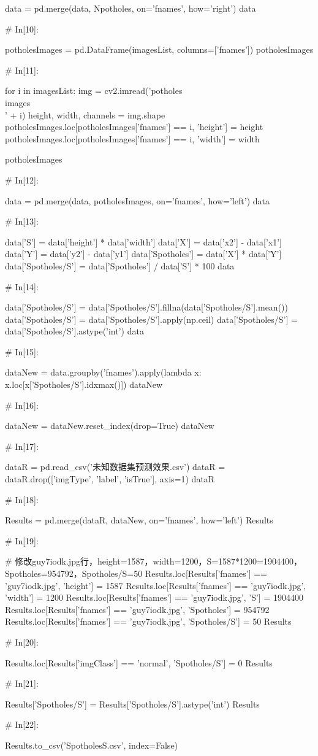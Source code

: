 \documentclass{MathorCupmodeling}
\begin{document}
\begin{python}
data = pd.merge(data, Npotholes, on='fnames', how='right')
data

# In[10]:


potholesImages = pd.DataFrame(imagesList, columns=['fnames'])
potholesImages

# In[11]:


for i in imagesList:
    img = cv2.imread('potholes\\images\\' + i)
    height, width, channels = img.shape
    potholesImages.loc[potholesImages['fnames'] == i, 'height'] = height
    potholesImages.loc[potholesImages['fnames'] == i, 'width'] = width

potholesImages

# In[12]:


data = pd.merge(data, potholesImages, on='fnames', how='left')
data

# In[13]:


data['S'] = data['height'] * data['width']
data['X'] = data['x2'] - data['x1']
data['Y'] = data['y2'] - data['y1']
data['Spotholes'] = data['X'] * data['Y']
data['Spotholes/S'] = data['Spotholes'] / data['S'] * 100
data

# In[14]:


data['Spotholes/S'] = data['Spotholes/S'].fillna(data['Spotholes/S'].mean())
data['Spotholes/S'] = data['Spotholes/S'].apply(np.ceil)
data['Spotholes/S'] = data['Spotholes/S'].astype('int')
data

# In[15]:


dataNew = data.groupby('fnames').apply(lambda x: x.loc[x['Spotholes/S'].idxmax()])
dataNew

# In[16]:


dataNew = dataNew.reset_index(drop=True)
dataNew

# In[17]:


dataR = pd.read_csv('未知数据集预测效果.csv')
dataR = dataR.drop(['imgType', 'label', 'isTrue'], axis=1)
dataR

# In[18]:


Results = pd.merge(dataR, dataNew, on='fnames', how='left')
Results

# In[19]:


# 修改guy7iodk.jpg行，height=1587，width=1200，S=1587*1200=1904400，Spotholes=954792，Spotholes/S=50
Results.loc[Results['fnames'] == 'guy7iodk.jpg', 'height'] = 1587
Results.loc[Results['fnames'] == 'guy7iodk.jpg', 'width'] = 1200
Results.loc[Results['fnames'] == 'guy7iodk.jpg', 'S'] = 1904400
Results.loc[Results['fnames'] == 'guy7iodk.jpg', 'Spotholes'] = 954792
Results.loc[Results['fnames'] == 'guy7iodk.jpg', 'Spotholes/S'] = 50
Results

# In[20]:


Results.loc[Results['imgClass'] == 'normal', 'Spotholes/S'] = 0
Results

# In[21]:


Results['Spotholes/S'] = Results['Spotholes/S'].astype('int')
Results

# In[22]:


Results.to_csv('SpotholesS.csv', index=False)
\end{python}
\end{document}
